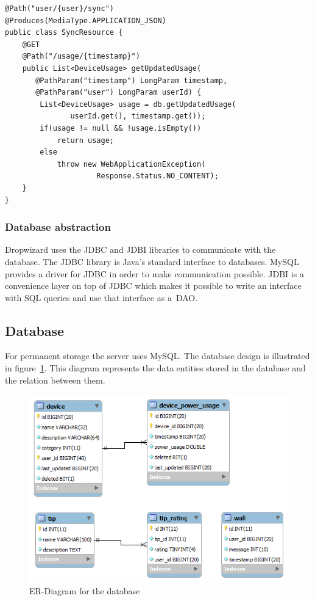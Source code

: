 \noindent\begin{minipage}{\textwidth}
\begin{lstlisting}[caption={Dropwizard resource example}, label={lst:dropwizardResource}]
@Path("user/{user}/sync")
@Produces(MediaType.APPLICATION_JSON)
public class SyncResource {
    @GET
    @Path("/usage/{timestamp}")
    public List<DeviceUsage> getUpdatedUsage(
	   @PathParam("timestamp") LongParam timestamp, 
	   @PathParam("user") LongParam userId) {
        List<DeviceUsage> usage = db.getUpdatedUsage(
		       userId.get(), timestamp.get());
        if(usage != null && !usage.isEmpty())
            return usage;
        else
            throw new WebApplicationException(
			         Response.Status.NO_CONTENT);
    }
}
\end{lstlisting}
\end{minipage}

\subsubsection{Database abstraction}
Dropwizard uses the JDBC and JDBI libraries to communicate with the database. The JDBC library is Java's standard interface to databases. MySQL provides a driver for JDBC in order to make communication possible. JDBI is a convenience layer on top of JDBC which makes it possible to write an interface with SQL queries and use that interface as a~\gls{DAO}.

\newpage
\subsection{Database}
For permanent storage the server uses MySQL. The database design is illustrated in figure~\ref{fig:ER-Diagram}. This diagram represents the data entities stored in the database and the relation between them. 

\begin{figure}[H]
\includegraphics[width=\textwidth]{ch/architecture/fig/ER-Diagram.png}
\caption{ER-Diagram for the database}
\label{fig:ER-Diagram}
\end{figure}
